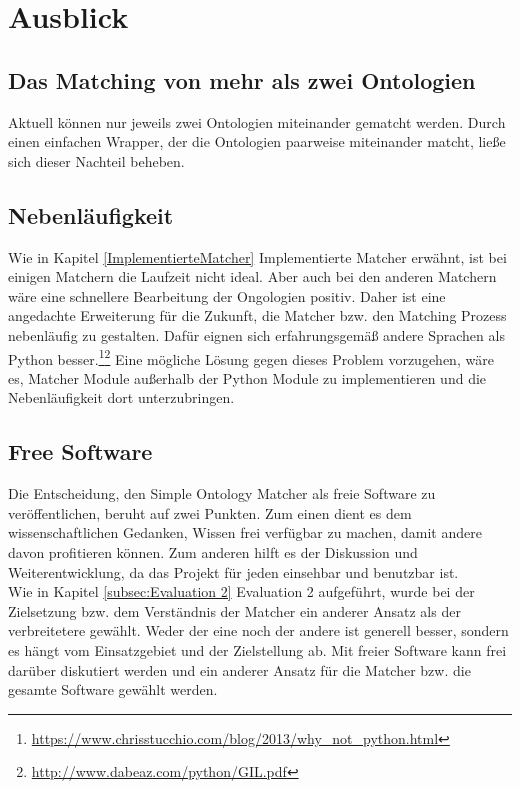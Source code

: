 %
\chapter{Ausblick}
\label{chap:outlook}      

\section{Das Matching von mehr als zwei Ontologien}
Aktuell können nur jeweils zwei Ontologien miteinander gematcht werden. Durch
einen einfachen Wrapper, der die Ontologien paarweise miteinander matcht, ließe
sich dieser Nachteil beheben.

\section{Nebenläufigkeit}
Wie in Kapitel \ref{ImplementierteMatcher} Implementierte Matcher erwähnt, ist
bei einigen Matchern die Laufzeit nicht ideal. Aber auch bei den anderen Matchern wäre eine schnellere
Bearbeitung der Ongologien positiv. Daher ist eine angedachte Erweiterung für
die Zukunft, die Matcher bzw.
den Matching Prozess nebenläufig zu gestalten. Dafür eignen sich erfahrungsgemäß
andere Sprachen als Python
besser.\footnote{\url{https://www.chrisstucchio.com/blog/2013/why_not_python.html}}\footnote{\url{http://www.dabeaz.com/python/GIL.pdf}}
Eine mögliche Lösung gegen dieses Problem vorzugehen, wäre es, Matcher Module
außerhalb der Python Module zu implementieren und die Nebenläufigkeit dort unterzubringen.

\section{Free Software}
Die Entscheidung, den Simple Ontology Matcher als freie Software zu
veröffentlichen, beruht auf zwei Punkten. Zum einen dient es dem
wissenschaftlichen Gedanken, Wissen frei verfügbar zu machen, damit andere davon
profitieren können. Zum anderen hilft es der Diskussion und Weiterentwicklung,
da das Projekt für jeden einsehbar und benutzbar ist.\\
Wie in Kapitel \ref{subsec:Evaluation 2} Evaluation 2 aufgeführt, wurde bei der
Zielsetzung bzw. dem Verständnis der Matcher ein anderer Ansatz als der
verbreitetere gewählt. Weder der eine noch der andere ist generell besser,
sondern es hängt vom Einsatzgebiet und der Zielstellung ab. Mit freier Software
kann frei darüber diskutiert werden und ein anderer Ansatz für die Matcher bzw.
die gesamte Software gewählt werden.
